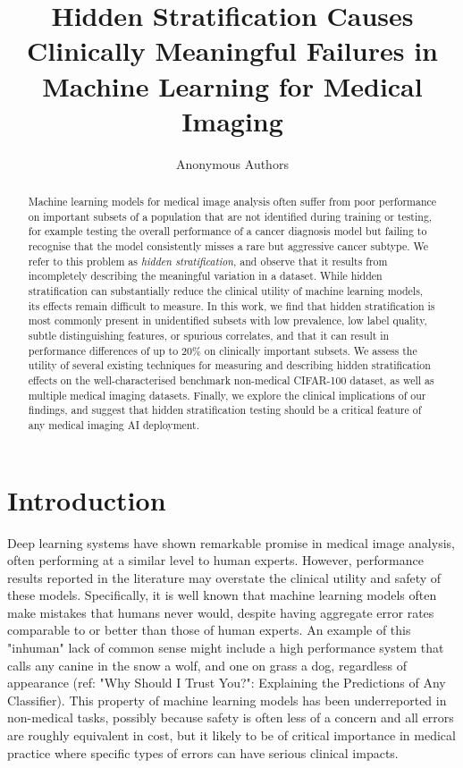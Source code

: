\documentclass{article}
\title{Hidden Stratification Causes Clinically Meaningful Failures in Machine Learning for Medical Imaging
}
\author{%
Anonymous Authors
}
\begin{document}
\maketitle

\begin{abstract}
Machine learning models for medical image analysis often suffer from poor performance on important subsets of a population that are not identified during training or testing, for example testing the overall performance of a cancer diagnosis model but failing to recognise that the model consistently misses a rare but aggressive cancer subtype.    
We refer to this problem as \textit{hidden stratification}, and observe that it results from incompletely describing the meaningful variation in a dataset.
While hidden stratification can substantially reduce the clinical utility of machine learning models, its effects remain difficult to measure.
In this work, we find that hidden stratification is most commonly present in unidentified subsets with low prevalence, low label quality, subtle distinguishing features, or spurious correlates, and that it can result in performance differences of up to 20\% on clinically important subsets.
We assess the utility of several existing techniques for measuring and describing hidden stratification effects on the well-characterised benchmark non-medical CIFAR-100 dataset, as well as multiple medical imaging datasets.
Finally, we explore the clinical implications of our findings, and suggest that hidden stratification testing should be a critical feature of any medical imaging AI deployment.

\end{abstract}

\section{Introduction}

Deep learning systems have shown remarkable promise in medical image analysis, often performing at a similar level to human experts. 
 However, performance results reported in the literature may overstate the clinical utility and safety of these models.  
 Specifically, it is well known that machine learning models often make mistakes that humans never would, despite having aggregate error rates comparable to or better than those of human experts. An example of this "inhuman" lack of common sense might include a high performance system that calls any canine in the snow a wolf, and one on grass a dog, regardless of appearance (ref: "Why Should I Trust You?": Explaining the Predictions of Any Classifier).
 This property of machine learning models has been underreported in non-medical tasks, possibly because safety is often less of a concern and all errors are roughly equivalent in cost, but it likely to be of critical importance in medical practice where specific types of errors can have serious clinical impacts. 
 
\end{document}
